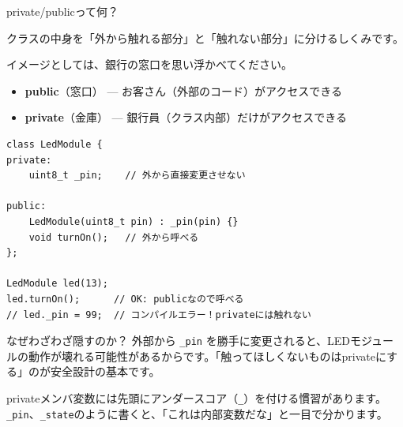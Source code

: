 \begin{qabox}{private/publicって何？}

クラスの中身を「外から触れる部分」と「触れない部分」に分けるしくみです。

\vspace{2mm}
イメージとしては、銀行の窓口を思い浮かべてください。

\begin{itemize}
  \item \textbf{public}（窓口） — お客さん（外部のコード）がアクセスできる
  \item \textbf{private}（金庫） — 銀行員（クラス内部）だけがアクセスできる
\end{itemize}

\begin{lstlisting}
class LedModule {
private:
    uint8_t _pin;    // 外から直接変更させない

public:
    LedModule(uint8_t pin) : _pin(pin) {}
    void turnOn();   // 外から呼べる
};

LedModule led(13);
led.turnOn();      // OK: publicなので呼べる
// led._pin = 99;  // コンパイルエラー！privateには触れない
\end{lstlisting}

なぜわざわざ隠すのか？ 外部から \texttt{\_pin} を勝手に変更されると、LEDモジュールの動作が壊れる可能性があるからです。「触ってほしくないものはprivateにする」のが安全設計の基本です。

\begin{notebox}[命名の慣習]
privateメンバ変数には先頭にアンダースコア（\texttt{\_}）を付ける慣習があります。\texttt{\_pin}、\texttt{\_state}のように書くと、「これは内部変数だな」と一目で分かります。
\end{notebox}

\end{qabox}

